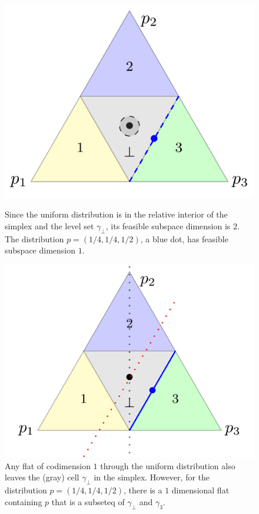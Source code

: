 \documentclass{article}
\begin{document}
\begin{figure}
\begin{minipage}{0.45\linewidth}
	\centering
	\includegraphics[width=\linewidth]{tikz/fsd-bound.pdf}
	\caption{Since the uniform distribution is in the relative interior of the simplex and the level set $\gamma_\bot$, its feasible subspace dimension is $2$. The distribution $p = (1/4, 1/4, 1/2)$, a blue dot, has feasible subspace dimension $1$.}
	\label{fig:fsd-bound}
\end{minipage}
\hfill
\begin{minipage}{0.45\linewidth}
	\centering
	\includegraphics[width=\linewidth]{tikz/flats-bound.pdf}
	\caption{Any flat of codimension $1$ through the uniform distribution also leaves the (gray) cell $\gamma_\bot$ in the simplex. However, for the distribution $p = (1/4, 1/4, 1/2)$, there is a $1$ dimensional flat containing $p$ that is a subseteq of $\gamma_\bot$ and $\gamma_3$.}
	\label{fig:flats-bound}
\end{minipage}
\end{figure}
\end{document}
